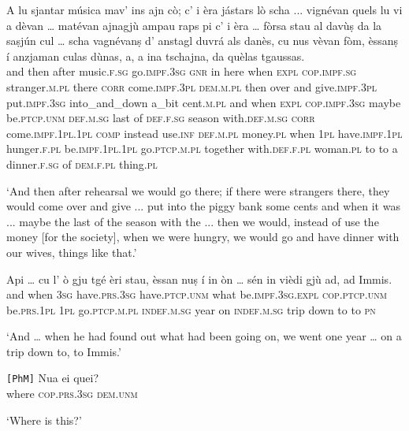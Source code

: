 \begin{linenumbers}
\gll    A lu sjantar música mav’ ins ajn cò; c’ i èra jástars lò scha ... vignévan quels lu vi a dèvan … matévan ajnagjù ampau raps pi c’ i èra … fòrsa stau al davùṣ da la saṣjún  cul … scha vagnévanṣ d’ anstagl duvrá als danès, cu nus vèvan fòm, èssanṣ í anzjaman culas dùnas, a, a ina tschajna, da quèlas tgaussas.\\
and then after music.\textsc{f.sg} go.\textsc{impf.3sg} \textsc{gnr} in here when \textsc{expl} \textsc{cop.impf.sg} stranger.\textsc{m.pl} there \textsc{corr} {} come.\textsc{impf.3pl} \textsc{dem.m.pl} then over and give.\textsc{impf.3pl} {} put.\textsc{impf.3sg} into\_and\_down a\_bit cent.\textsc{m.pl} and when \textsc{expl} \textsc{cop.impf.3sg} {} maybe be.\textsc{ptcp.unm} \textsc{def.m.sg} last of    \textsc{def.f.sg} season with.\textsc{def.m.sg} {} \textsc{corr} come.\textsc{impf.1pl.1pl} \textsc{comp} instead use.\textsc{inf}  \textsc{def.m.pl} money.\textsc{pl} when  \textsc{1pl} have.\textsc{impf.1pl} hunger.\textsc{f.pl} be.\textsc{impf.1pl.1pl} go.\textsc{ptcp.m.pl} together with.\textsc{def.f.pl} woman.\textsc{pl} to to a dinner.\textsc{f.sg} of \textsc{dem.f.pl} thing.\textsc{pl}\\
\end{linenumbers}
\medskip
\glt `And then after rehearsal we would go there; if there were strangers there, they would come over and give ... put into the piggy bank  some cents and when it was ... maybe the last of the season with the ... then we would, instead of use the money [for the society], when we were hungry, we would go and have dinner with our wives, things like that.'
\medskip

\begin{linenumbers}
\gll    Api … cu l’ ò gju tgé èri stau, èssan nuṣ í in òn … sén in vièdi gjù ad, ad Immis.\\
and {} when \textsc{3sg} have.\textsc{prs.3sg} have.\textsc{ptcp.unm} what be.\textsc{impf.3sg.expl} \textsc{cop.ptcp.unm} be.\textsc{prs.1pl} \textsc{1pl} go.\textsc{ptcp.m.pl} \textsc{indef.m.sg} year {} on \textsc{indef.m.sg} trip down to to \textsc{pn} \\
\end{linenumbers}
\medskip
\glt `And … when he had found out what had been going on, we went one year … on a trip down to, to Immis.'
\medskip

\begin{linenumbers}
\gll    \texttt{[PhM]} Nua ei quei?\\
{} where \textsc{cop.prs.3sg} \textsc{dem.unm}\\
\end{linenumbers}
\medskip
\glt `Where is this?'
\medskip

